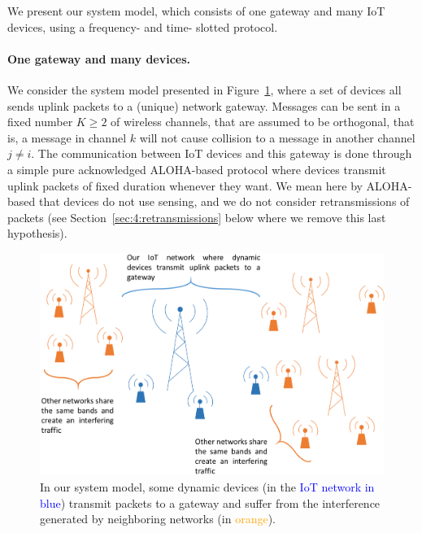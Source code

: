 We present our system model, which consists of one gateway and many IoT devices, using a frequency- and time- slotted protocol.

\paragraph{One gateway and many devices.}
%
We consider the system model presented in Figure~\ref{fig:41:system_model1}, where a set of devices all sends uplink packets to a (unique) network gateway.
Messages can be sent in a fixed number $K\geq2$ of wireless channels,
that are assumed to be orthogonal, that is, a message in channel $k$ will not cause collision to a message in another channel $j \neq i$.
The communication between IoT devices and this gateway is done through a simple pure acknowledged ALOHA-based protocol where devices transmit uplink packets of fixed duration whenever they want.
We mean here by ALOHA-based that devices do not use sensing, and we do not consider retransmissions of packets (see Section~\ref{sec:4:retransmissions} below where we remove this last hypothesis).
%

\begin{figure}[!t]
    \centering
    \includegraphics[width=0.70\linewidth]{system_model1.eps}
    \caption{In our system model, some dynamic devices (in the \textcolor{blue}{IoT network in blue}) transmit packets to a gateway and suffer from the interference generated by neighboring networks (in \textcolor{orange}{orange}).}
    \label{fig:41:system_model1}
\end{figure}


